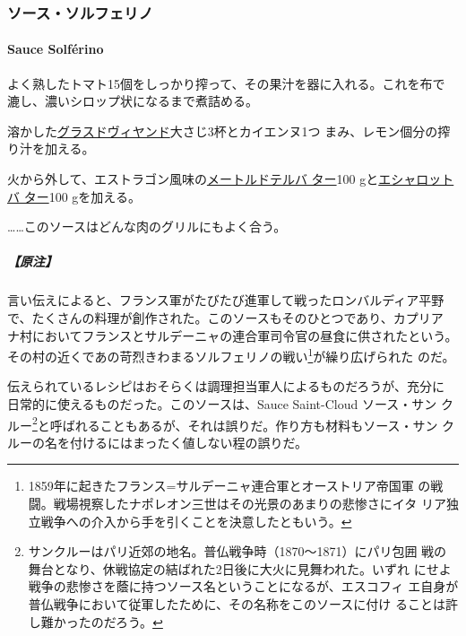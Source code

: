 \begin{recette}
\maeaki

\hypertarget{ux30bdux30fcux30b9ux30bdux30ebux30d5ux30a7ux30eaux30ce}{%
\subsubsection{ソース・ソルフェリノ}\label{ux30bdux30fcux30b9ux30bdux30ebux30d5ux30a7ux30eaux30ce}}

\hypertarget{sauce-solfuxe9rino}{%
\paragraph{Sauce Solférino}\label{sauce-solfuxe9rino}}


よく熟したトマト15個をしっかり搾って、その果汁を器に入れる。これを布で
漉し、濃いシロップ状になるまで煮詰める。

溶かした\protect\hyperlink{glace-de-viande}{グラスドヴィヤンド}大さじ3杯とカイエンヌ1つ
まみ、レモン\undemi{}個分の搾り汁を加える。

火から外して、エストラゴン風味の\protect\hyperlink{beurre-maitre-d-hotel}{メートルドテルバ
ター}100 gと\protect\hyperlink{beurre-d-echalote}{エシャロットバ
ター}100 gを加える。

\ldots{}\ldots{}このソースはどんな肉のグリルにもよく合う。

\hypertarget{ux539fux6ce8-17}{%
\subparagraph{【原注】}\label{ux539fux6ce8-17}}

言い伝えによると、フランス軍がたびたび進軍して戦ったロンバルディア平野
で、たくさんの料理が創作された。このソースもそのひとつであり、カプリア
ナ村においてフランスとサルデーニャの連合軍司令官の昼食に供されたという。
その村の近くであの苛烈きわまるソルフェリノの戦い\footnote{1859年に起きたフランス=サルデーニャ連合軍とオーストリア帝国軍
  の戦闘。戦場視察したナポレオン三世はその光景のあまりの悲惨さにイタ
  リア独立戦争への介入から手を引くことを決意したともいう。}が繰り広げられた
のだ。

伝えられているレシピはおそらくは調理担当軍人によるものだろうが、充分に
日常的に使えるものだった。このソースは、Sauce Saint-Cloud ソース・サン
クルー\footnote{サンクルーはパリ近郊の地名。普仏戦争時（1870〜1871）にパリ包囲
  戦の舞台となり、休戦協定の結ばれた2日後に大火に見舞われた。いずれ
  にせよ戦争の悲惨さを蔭に持つソース名ということになるが、エスコフィ
  エ自身が普仏戦争において従軍したために、その名称をこのソースに付け
  ることは許し難かったのだろう。}と呼ばれることもあるが、それは誤りだ。作り方も材料もソース・サン
クルーの名を付けるにはまったく値しない程の誤りだ。


\end{recette}
